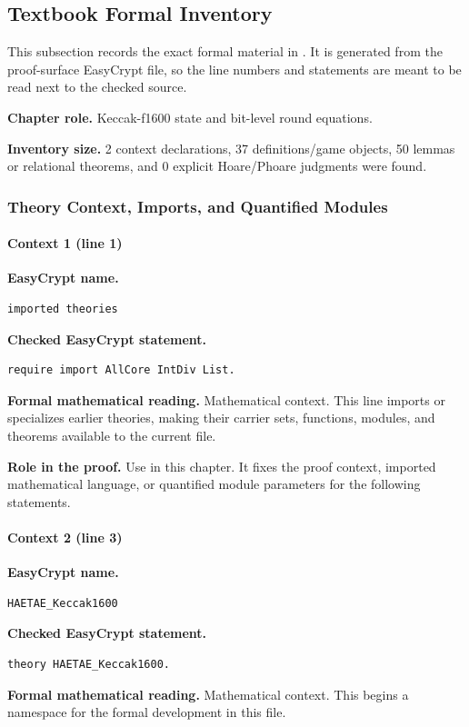 \subsection*{Textbook Formal Inventory}
This subsection records the exact formal material in .  It is generated from the proof-surface EasyCrypt file, so the line numbers and statements are meant to be read next to the checked source.

\noindent\textbf{Chapter role.} Keccak-f1600 state and bit-level round equations.

\noindent\textbf{Inventory size.} 2 context declarations, 37 definitions/game objects, 50 lemmas or relational theorems, and 0 explicit Hoare/Phoare judgments were found.

\subsubsection*{Theory Context, Imports, and Quantified Modules}
\paragraph{Context 1 (line 1)}
\noindent\textbf{EasyCrypt name.}
\begin{lstlisting}[language=EasyCrypt,basicstyle=\ttfamily\scriptsize]
imported theories
\end{lstlisting}
\noindent\textbf{Checked EasyCrypt statement.}
\begin{lstlisting}[language=EasyCrypt,basicstyle=\ttfamily\scriptsize]
require import AllCore IntDiv List.
\end{lstlisting}
\noindent\textbf{Formal mathematical reading.}
Mathematical context. This line imports or specializes earlier theories, making their carrier sets, functions, modules, and theorems available to the current file.

\noindent\textbf{Role in the proof.}
Use in this chapter. It fixes the proof context, imported mathematical language, or quantified module parameters for the following statements.

\paragraph{Context 2 (line 3)}
\noindent\textbf{EasyCrypt name.}
\begin{lstlisting}[language=EasyCrypt,basicstyle=\ttfamily\scriptsize]
HAETAE_Keccak1600
\end{lstlisting}
\noindent\textbf{Checked EasyCrypt statement.}
\begin{lstlisting}[language=EasyCrypt,basicstyle=\ttfamily\scriptsize]
theory HAETAE_Keccak1600.
\end{lstlisting}
\noindent\textbf{Formal mathematical reading.}
Mathematical context. This begins a namespace for the formal development in this file.


